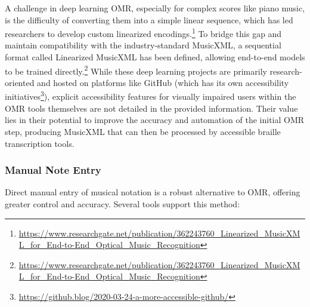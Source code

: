 A challenge in deep learning OMR, especially for complex scores like piano music, is the difficulty of converting them into a simple linear sequence, which has led researchers to develop custom linearized encodings.\footnote{\url{https://www.researchgate.net/publication/362243760_Linearized_MusicXML_for_End-to-End_Optical_Music_Recognition}} To bridge this gap and maintain compatibility with the industry-standard MusicXML, a sequential format called Linearized MusicXML has been defined, allowing end-to-end models to be trained directly.\footnote{\url{https://www.researchgate.net/publication/362243760_Linearized_MusicXML_for_End-to-End_Optical_Music_Recognition}} While these deep learning projects are primarily research-oriented and hosted on platforms like GitHub (which has its own accessibility initiatives\footnote{\url{https://github.blog/2020-03-24-a-more-accessible-github/}}), explicit accessibility features for visually impaired users within the OMR tools themselves are not detailed in the provided information. Their value lies in their potential to improve the accuracy and automation of the initial OMR step, producing MusicXML that can then be processed by accessible braille transcription tools.

\subsubsection{Manual Note Entry}
Direct manual entry of musical notation is a robust alternative to OMR, offering greater control and accuracy. Several tools support this method:

